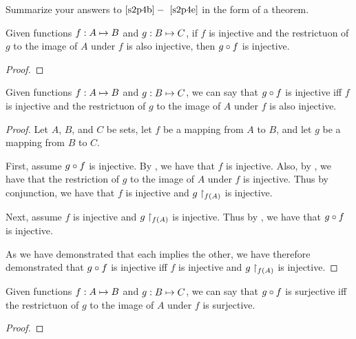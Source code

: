 \documentclass[main.tex]{subfiles}
\begin{document}
\subproblem{}\label{s2p4f}

Summarize your answers to \(\ref{s2p4b} -~\ref{s2p4e}\) in the form of a
theorem.

\begin{thm}
	Given functions \({f}: {A} \mapsto{} {B}\) and \({g}: {B} \mapsto{} {C}\), if
	\(f\) is injective and the restrictuon of \(g\) to the image of \(A\)
	under \(f\) is also injective, then \({g} \circ{} {f}\) is injective.
\end{thm}
\begin{proof}
	\todo{}
\end{proof}

\begin{thm}
	Given functions \({f}: {A} \mapsto{} {B}\) and \({g}: {B} \mapsto{} {C}\), we can
	say that \({g} \circ{} {f}\) is injective iff \(f\) is injective and the
	restrictuon of \(g\) to the image of \(A\) under \(f\) is also
	injective.
\end{thm}
\begin{proof}
	Let \(A\), \(B\), and \(C\) be sets, let \(f\) be a mapping from \(A\)
	to \(B\), and let \(g\) be a mapping from \(B\) to \(C\).

	First, assume \({g} \circ{} {f}\) is injective. By , we
	have that \(f\) is injective. Also, by , we have that
	the restriction of \(g\) to the image of \(A\) under \(f\) is injective.
	Thus by conjunction, we have that \(f\) is injective and
	\({g}\restriction_{f(A)}\) is injective.

	Next, assume \(f\) is injective and \({g}\restriction_{f(A)}\) is injective.
	Thus by , we have that \({g} \circ{} {f}\) is injective.

	As we have demonstrated that each implies the other, we have therefore
	demonstrated that \({g} \circ{} {f}\) is injective iff \(f\) is injective
	and \({g}\restriction_{f(A)}\) is injective.
\end{proof}

\begin{thm}
	Given functions \({f}: {A} \mapsto{} {B}\) and \({g}: {B} \mapsto{} {C}\), we can
	say that \({g} \circ{} {f}\) is surjective iff the restrictuon of \(g\)
	to the image of \(A\) under \(f\) is surjective.
\end{thm}
\begin{proof}
	\todo{}
\end{proof}
\end{document}
